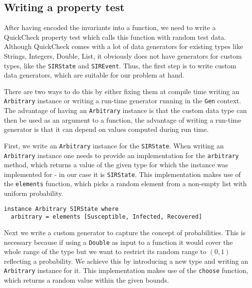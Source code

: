 \subsection{Writing a property test}
After having encoded the invariants into a function, we need to write a QuickCheck property test which calls this function with random test data. Although QuickCheck comes with a lot of data generators for existing types like Strings, Integers, Double, List, it obviously does not have generators for custom types, like the \texttt{SIRState} and \texttt{SIREvent}. Thus, the first step is to write custom data generators, which are suitable for our problem at hand.

There are two ways to do this by either fixing them at compile time writing an \texttt{Arbitrary} instance or writing a run-time generator running in the \texttt{Gen} context. The advantage of having an \texttt{Arbitrary} instance is that the custom data type can then be used as an argument to a function, the advantage of writing a run-time generator is that it can depend on values computed during run time.

First, we write an \texttt{Arbitrary} instance for the \texttt{SIRState}. When writing an \texttt{Arbitrary} instance one needs to provide an implementation for the \texttt{arbitrary} method, which returns a value of the given type for which the instance was implemented for - in our case it is \texttt{SIRState}. This implementation makes use of the \texttt{elements} function, which picks a random element from a non-empty list with uniform probability.

\begin{footnotesize}
\begin{verbatim}
instance Arbitrary SIRState where
  arbitrary = elements [Susceptible, Infected, Recovered]
\end{verbatim}
\end{footnotesize}

Next we write a custom generator to capture the concept of probabilities. This is necessary because if using a \texttt{Double} as input to a function it would cover the whole range of the type but we want to restrict its random range to $(0,1)$ reflecting a probability. We achieve this by introducing a new type and writing an \texttt{Arbitrary} instance for it. This implementation makes use of the \texttt{choose} function, which returns a random value within the given bounds.

